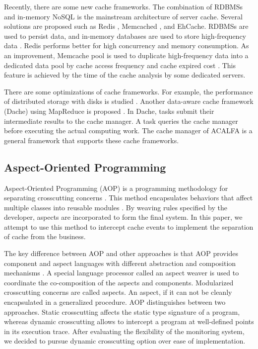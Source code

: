 \documentclass{singlecol-new}
\theoremstyle{TH}{
\newtheorem{lemma}{Lemma}
\newtheorem{theorem}[lemma]{Theorem}
\newtheorem{corrolary}[lemma]{Corrolary}
\newtheorem{conjecture}[lemma]{Conjecture}
\newtheorem{proposition}[lemma]{Proposition}
\newtheorem{claim}[lemma]{Claim}
\newtheorem{stheorem}[lemma]{Wrong Theorem}
}
\theoremstyle{THrm}{
\newtheorem{definition}{Definition}[section]
\newtheorem{question}{Question}[section]
\newtheorem{remark}{Remark}
\newtheorem{scheme}{Scheme}
}
\theoremstyle{THhit}{
\newtheorem{case}{Case}[section]
}
\begin{document}
Recently, there are some new cache frameworks. The combination of RDBMSs and in-memory NoSQL is the mainstream architecture of server cache. Several solutions are proposed such as Redis \cite{zawodny2009redis}, Memcached \cite{hafeez2017realizing}, and EhCache. RDBMSs are used to persist data, and in-memory databases are used to store high-frequency data \cite {ma2017column}. Redis performs better for high concurrency and memory consumption. As an improvement, Memcache pool is used to duplicate high-frequency data into a dedicated data pool by cache access frequency and cache expired cost \cite{nishtala2013scaling}. This feature is achieved by the time of the cache analysis by some dedicated servers.

There are some optimizations of cache frameworks. For example, the performance of distributed storage with disks is studied \cite{scheuermann1998data}. Another data-aware cache framework (Dache) using MapReduce is proposed \cite{zhao2014dache}. In Dache, tasks submit their intermediate results to the cache manager. A task queries the cache manager before executing the actual computing work. The cache manager of ACALFA is a general framework that supports these cache frameworks.

\subsection{Aspect-Oriented Programming}
Aspect-Oriented Programming (AOP) is a programming methodology for separating crosscutting concerns \cite{kiczales2001aspect}. This method encapsulates behaviors that affect multiple classes into reusable modules \cite{ma2013toward}. By weaving rules specified by the developer, aspects are incorporated to form the final system. In this paper, we attempt to use this method to intercept cache events to implement the separation of cache from the business.

The key difference between AOP and other approaches is that AOP provides component and aspect languages with different abstraction and composition mechanisms \cite{pinto2017lara}. A special language processor called an aspect weaver is used to coordinate the co-composition of the aspects and components. Modularized crosscutting concerns are called aspects. An aspect, if it can not be cleanly encapsulated in a generalized procedure. AOP distinguishes between two approaches. Static crosscutting affects the static type signature of a program, whereas dynamic crosscutting allows to intercept a program at well-defined points in its execution trace. After evaluating the flexibility of the monitoring system, we decided to pursue dynamic crosscutting option over ease of implementation.
\end{document}
